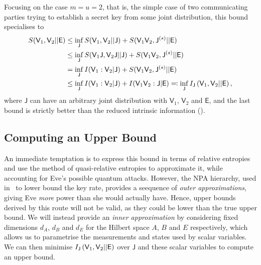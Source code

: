 \documentclass[10pt, a4paper]{article}
\numberwithin{equation}{section} %
\theoremstyle{definition}
\theoremstyle{plain}
\newcommand{\?}{\mathrel{?}} %
\newcommand{\crv}[1]{\mathsf{#1}}
\begin{document}
    Focusing on the case \(m = u = 2\), that is, the simple case of two communicating parties trying to establish a secret key from some joint distribution, this bound specialises to
    \begin{align}
      S(\crv{V}_1, \crv{V}_2||\crv{E}) &\leq \inf_\crv{J} S(\crv{V}_1, \crv{V}_2||\crv{J}) + S(\crv{V}_1\crv{V}_2, \crv{J}^{(s)}||\crv{E}) \\
                     &\leq \inf_\crv{J} S(\crv{V}_1\crv{J}, \crv{V}_2\crv{J}||\crv{J}) + S(\crv{V}_1\crv{V}_2, \crv{J}^{(s)}||\crv{E}) \\
                     &= \inf_\crv{J} I(\crv{V}_1 : \crv{V}_2|\crv{J}) + S(\crv{V}_1\crv{V}_2, \crv{J}^{(s)}||\crv{E}) \\
                     &\leq \inf_\crv{J} I(\crv{V}_1 : \crv{V}_2|\crv{J}) + I(\crv{V}_1\crv{V}_2 : \crv{J}|\crv{E}) \eqqcolon \inf_{\crv{J}} \splitkey{\crv{V}_1,\crv{V}_2}{\crv{E}},
    \end{align}
    where \(\crv{J}\) can have an arbitrary joint distribution with \(\crv{V}_1\), \(\crv{V}_2\) and \(\crv{E}\), and the last bound is strictly better than the reduced intrinsic information ().

    \subsection{Computing an Upper Bound}

    An immediate temptation is to express this bound in terms of relative entropies and use the method of quasi-relative entropies to approximate it, while accounting for Eve's possible quantum attacks. However, the NPA hierarchy, used in~\cite{BFF_QRE} to lower bound the key rate, provides a seequence of \emph{outer approximations}, giving Eve \emph{more} power than she would actually have. Hence, upper bounds derived by this route will not be valid, as they could be lower than the true upper bound. We will instead provide an \emph{inner approximation} by considering fixed dimensions \(d_A\), \(d_B\) and \(d_E\) for the Hilbert space \(A\), \(B\) and \(E\) respectively, which allows us to parametrise the measurements and states used by scalar variables. We can then minimise \(\splitkey{\crv{V}_1,\crv{V}_2}{\crv{E}}\) over \(\crv{J}\) and these scalar variables to compute an upper bound.
\end{document}

